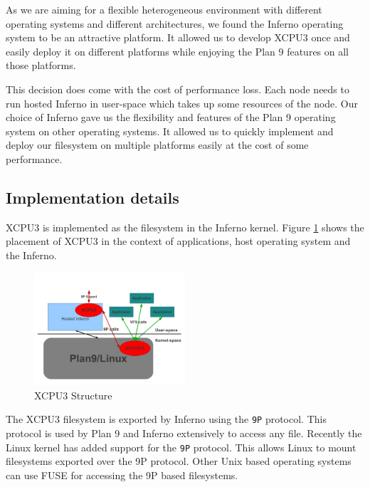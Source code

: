 \documentclass[conference]{IEEEtran}
\begin{document}
As we are aiming for a flexible heterogeneous environment with different
operating systems and different architectures, we found the Inferno operating
system to be an attractive platform.  It allowed us to develop XCPU3 once and
easily deploy it on different platforms while enjoying the Plan 9 features
on all those platforms.

This decision does come with the cost of performance loss.  Each node needs
to run hosted Inferno in user-space which takes up some resources of the node. 
Our choice of Inferno gave us the flexibility and features of the Plan 9
operating system on other operating systems.  It allowed us to quickly
implement and deploy our filesystem on multiple platforms easily at the cost
of some performance.

\subsection{Implementation details}

XCPU3 is implemented as the filesystem in the Inferno kernel.  Figure 
\ref{fig:XCPU3} shows the placement of XCPU3 in the context of applications,
host operating system and the Inferno.

\begin{figure}[h]
  \begin{center}
    \leavevmode
      \includegraphics[height=0.2\textheight,width=0.5\textwidth]
		{./img/XCPU3Structure}
    \caption{XCPU3 Structure}
    \label{fig:XCPU3}
  \end{center}
\end{figure}

The XCPU3 filesystem is exported by Inferno using the \texttt{9P} protocol. 
This protocol is used by Plan 9 and Inferno extensively to access any file. 
Recently the Linux kernel has added support for the \texttt{9P}
protocol\cite{graverobbers}.  This allows Linux to mount filesystems
exported over the 9P protocol.  Other Unix based operating systems can use
FUSE\cite{FUSE} for accessing the 9P based filesystems. 
\end{document}
